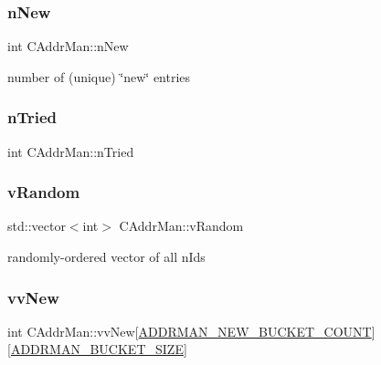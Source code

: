 \subsubsection{\texorpdfstring{n\+New}{nNew}}
{\footnotesize\ttfamily int C\+Addr\+Man\+::n\+New\hspace{0.3cm}{\ttfamily [private]}}



number of (unique) \char`\"{}new\char`\"{} entries 

\mbox{\label{class_c_addr_man_ae8566be810e6429012f1c2c1609b4540}} 
\subsubsection{\texorpdfstring{n\+Tried}{nTried}}
{\footnotesize\ttfamily int C\+Addr\+Man\+::n\+Tried\hspace{0.3cm}{\ttfamily [private]}}

\mbox{\label{class_c_addr_man_af9c2199d29d7a1a7c6c5c1e3abec4102}} 
\subsubsection{\texorpdfstring{v\+Random}{vRandom}}
{\footnotesize\ttfamily std\+::vector$<$int$>$ C\+Addr\+Man\+::v\+Random\hspace{0.3cm}{\ttfamily [private]}}



randomly-\/ordered vector of all n\+Ids 

\mbox{\label{class_c_addr_man_afb2dcfcd27aedab01f5259980f322fa8}} 
\subsubsection{\texorpdfstring{vv\+New}{vvNew}}
{\footnotesize\ttfamily int C\+Addr\+Man\+::vv\+New\mbox{[}\mbox{\hyperlink{addrman_8h_a74a626eb1dbb8e307a413e86493cd510}{A\+D\+D\+R\+M\+A\+N\+\_\+\+N\+E\+W\+\_\+\+B\+U\+C\+K\+E\+T\+\_\+\+C\+O\+U\+NT}}\mbox{]}\mbox{[}\mbox{\hyperlink{addrman_8h_a3499731a6c89e164cf74b68be2be0a84}{A\+D\+D\+R\+M\+A\+N\+\_\+\+B\+U\+C\+K\+E\+T\+\_\+\+S\+I\+ZE}}\mbox{]}\hspace{0.3cm}{\ttfamily [private]}}



